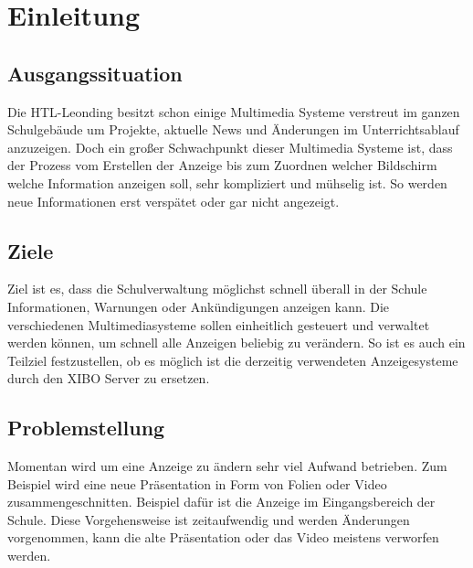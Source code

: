 \chapter{Einleitung}
\section{Ausgangssituation}
Die HTL-Leonding besitzt schon einige Multimedia Systeme verstreut im ganzen Schulgebäude um Projekte, aktuelle News und Änderungen im Unterrichtsablauf anzuzeigen. Doch ein großer Schwachpunkt dieser Multimedia Systeme ist, dass der Prozess vom Erstellen der Anzeige bis zum Zuordnen welcher Bildschirm welche Information anzeigen soll, sehr kompliziert und mühselig ist. So werden neue Informationen erst verspätet oder gar nicht angezeigt. 

\section{Ziele}
Ziel ist es, dass die Schulverwaltung möglichst schnell überall in der Schule Informationen, Warnungen oder Ankündigungen anzeigen kann. Die verschiedenen Multimediasysteme sollen einheitlich gesteuert und verwaltet werden können, um schnell alle Anzeigen beliebig zu verändern. So ist es auch ein Teilziel festzustellen, ob es möglich ist die derzeitig verwendeten Anzeigesysteme durch den XIBO Server zu ersetzen.

\section{Problemstellung}
Momentan wird um eine Anzeige zu ändern sehr viel Aufwand betrieben. Zum Beispiel wird eine neue Präsentation in Form von Folien oder Video zusammengeschnitten. Beispiel dafür ist die Anzeige im Eingangsbereich der Schule. Diese Vorgehensweise ist zeitaufwendig und werden Änderungen vorgenommen, kann  die alte Präsentation oder das Video meistens verworfen werden.

